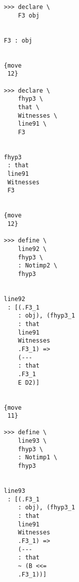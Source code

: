 \documentclass[12pt]{article}
\begin{document}
\begin{verbatim}
                                    >>> declare \
                                        F3 obj


                                    F3 : obj


                                    {move 
                                     12}

                                    >>> declare \
                                        fhyp3 \
                                        that \
                                        Witnesses \
                                        line91 \
                                        F3


                                    fhyp3 
                                     : that 
                                     line91 
                                     Witnesses 
                                     F3


                                    {move 
                                     12}

                                    >>> define \
                                        line92 \
                                        fhyp3 \
                                        : Notimp2 \
                                        fhyp3


                                    line92 
                                     : [(.F3_1 
                                        : obj), (fhyp3_1 
                                        : that 
                                        line91 
                                        Witnesses 
                                        .F3_1) => 
                                        (--- 
                                        : that 
                                        .F3_1 
                                        E D2)]


                                    {move 
                                     11}

                                    >>> define \
                                        line93 \
                                        fhyp3 \
                                        : Notimp1 \
                                        fhyp3


                                    line93 
                                     : [(.F3_1 
                                        : obj), (fhyp3_1 
                                        : that 
                                        line91 
                                        Witnesses 
                                        .F3_1) => 
                                        (--- 
                                        : that 
                                        ~ (B <<= 
                                        .F3_1))]



\end{verbatim}
\end{document}
